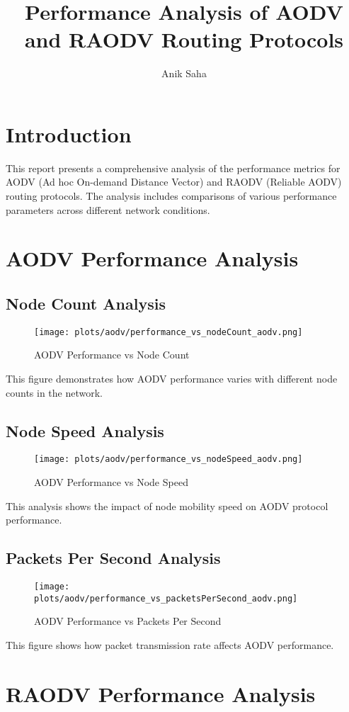\documentclass{article}
\begin{document}
\title{Performance Analysis of AODV and RAODV Routing Protocols}
\author{Anik Saha}
\maketitle
\newpage
\section{Introduction}
This report presents a comprehensive analysis of the performance metrics for AODV (Ad hoc On-demand Distance Vector) and RAODV (Reliable AODV) routing protocols. The analysis includes comparisons of various performance parameters across different network conditions.
\newpage
\section{AODV Performance Analysis}
\subsection{Node Count Analysis}
\begin{figure}[H]
\centering
\texttt{[image: plots/aodv/performance\_vs\_nodeCount\_aodv.png]}
\caption{AODV Performance vs Node Count}
\end{figure}
This figure demonstrates how AODV performance varies with different node counts in the network.
\newpage
\subsection{Node Speed Analysis}
\begin{figure}[H]
\centering
\texttt{[image: plots/aodv/performance\_vs\_nodeSpeed\_aodv.png]}
\caption{AODV Performance vs Node Speed}
\end{figure}
This analysis shows the impact of node mobility speed on AODV protocol performance.
\newpage
\subsection{Packets Per Second Analysis}
\begin{figure}[H]
\centering
\texttt{[image: plots/aodv/performance\_vs\_packetsPerSecond\_aodv.png]}
\caption{AODV Performance vs Packets Per Second}
\end{figure}
This figure shows how packet transmission rate affects AODV performance.
\newpage
\section{RAODV Performance Analysis}
\end{document}
